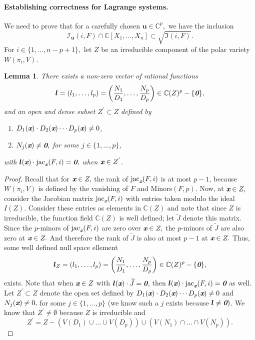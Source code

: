 \documentclass[a4paper]{article}
\def\bz{\textit{\textbf{0}}}
\def\ub{{\bm u}}
\def\lb{{\bm l}}
\def\xb{\textit{\textbf{x}}}
\def\jt{\widetilde{J}}
\DeclareMathOperator{\jac}{jac}
\def\minors{\textrm{Minors}(F,p)}
\def\C{\mathbb{C}}
\def\Wi{W(\pi_i,V)}
\def\Iir{\sqrt{\mathfrak{I}(i,F)}}
\def\ji{\jac_{\xb}(F,i)}
\def\Iil{\mathscr{I}_{\ub}(i,F)}
\newtheorem{lemma}[theorem]{Lemma}
\begin{document}
\paragraph*{Establishing correctness for Lagrange systems.}
%
We need to prove that for a carefully chosen $\ub \in \C^p,$ we have the inclusion 
\[\Iil \cap \C[X_1,\hdots,X_n] \subset \Iir.\] For $i \in \{1,\hdots,n-p+1\},$ let $Z$ be an irreducible component of the polar variety $\Wi$.
\begin{lemma}\label{lem:ratF}
There exists a non-zero vector of rational functions
\[\lb = (l_1,\hdots,l_p)=\left(\frac{N_1}{D_1},\hdots,\frac{N_p}{D_p}\right)\in \C(Z)^p-\{\bz\},\] 
and an open and dense subset $Z^{'} \subset Z$ defined by
\begin{enumerate}
    \item $D_1(\xb)\cdot D_2(\xb) \cdots D_p(\xb) \not = 0$,
    \item $N_j(\xb) \not = \bz,$ for some $j \in \{1,\hdots,p\}$, 
\end{enumerate}
with $\lb(\xb) \cdot \ji = \bz,$  when $\xb \in Z^{'}$.
%
%
\end{lemma}
%
\begin{proof}
Recall that for $\xb \in Z,$ the rank of $\ji$ is at most $p-1$, because $\Wi$ is defined by the vanishing of $F$ and $\minors$. Now,  at $\xb \in Z,$ consider the Jacobian matrix $\jac_{\xb}(F,i)$  with entries taken modulo the ideal $I(Z)$. Consider these entries as elements in $\C(Z)$ and note that since $Z$ is irreducible, the function field $\C(Z)$ is well defined; let $\jt$ denote this matrix.  Since the $p$-minors of $\ji$ are zero over $\xb \in Z,$ the $p$-minors of $\jt$ are also zero at $\xb \in Z.$ And therefore the rank of $\jt$ is also at most $p-1$ at $\xb \in Z.$ Thus, some well defined null space ellement 
\[\lb_Z = (l_{1},\hdots,l_p)=\left(\frac{N_1}{D_1},\hdots,\frac{N_p}{D_p}\right)\in \C(Z)^p-\{\bz\},\]
\noindent 
exists. Note that when $\xb \in Z$ with $\lb({\xb}) \cdot \jt = \bz$, then $\lb({\xb}) \cdot \ji = \bz$ as well. Let $Z^{'} \subset Z$ denote the open set defined by $D_1(\xb)\cdot D_2(\xb) \cdots D_p(\xb) \not = 0$ and $N_j(\xb) \not = 0,$ for some $j \in \{1,\hdots,p\}$ (we know such a $j$ exists because $\lb \not = \bz)$. We know that $Z^{'}\not=\emptyset$ because $Z$ is irreducible and 
\[
Z^{'} = Z- (V(D_1) \cup \hdots \cup V(D_p)) \cup (V(N_1) \cap \hdots \cap V(N_p)). 
\]
\end{proof}
%
\end{document}
